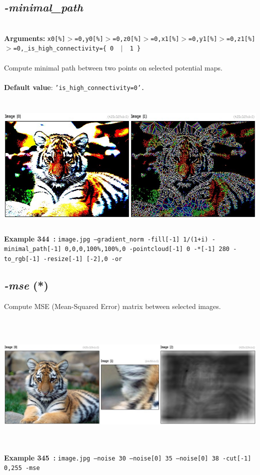 \documentclass[a4paper,11pt,twoside]{book}
\begin{document}
\subsection{\emph{-minimal\_path} }\vspace*{-0.5em}
~\\\textbf{Arguments: } 
{\small \texttt{x0[\%]$>$=0,y0[\%]$>$=0,z0[\%]$>$=0,x1[\%]$>$=0,y1[\%]$>$=0,z1[\%]$>$=0,\_is\_high\_connectivity=\{ 0 ~$|$~ 1 \}}}\\~\\
Compute minimal path between two points on selected potential maps.
~\\~\\\textbf{Default value}: {\small \texttt{'is\_high\_connectivity=0'.}}
\begin{center}\includegraphics[keepaspectratio=true,height=7cm,width=\textwidth]{img/gmic_def344.jpg}\\
{\footnotesize \textbf{Example 344~:} \texttt{image.jpg --gradient\_norm -fill[-1] 1/(1+i) -minimal\_path[-1] 0,0,0,100\%,100\%,0 -pointcloud[-1] 0 -*[-1] 280 -to\_rgb[-1] -resize[-1] [-2],0 -or}}
\end{center}

\subsection{\emph{-mse} (*)}\vspace*{-0.5em}
Compute MSE (Mean-Squared Error) matrix between selected images.
\begin{center}\includegraphics[keepaspectratio=true,height=7cm,width=\textwidth]{img/gmic_def345.jpg}\\
{\footnotesize \textbf{Example 345~:} \texttt{image.jpg --noise 30 --noise[0] 35 --noise[0] 38 -cut[-1] 0,255 -mse}}
\end{center}
\end{document}
